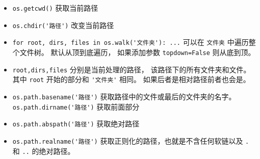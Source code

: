 
\begin{issues}
\issueDraft
\end{issues}

\begin{itemize}
\item \verb`os.getcwd()` 获取当前路径
\item \verb`os.chdir('路径')` 改变当前路径 
\item \verb`for root, dirs, files in os.walk('文件夹'): ...` 可以在 \verb`文件夹` 中遍历整个文件树。 默认从顶到底遍历， 如果添加参数 \verb`topdown=False` 则从底到顶。
\item \verb`root,dirs,files` 分别是当前处理的路径， 该路径下的所有文件夹和文件。 其中 \verb`root` 开始的部分和 \verb`'文件夹'` 相同。 如果后者是相对路径前者也会是。
\item \verb`os.path.basename('路径')` 获取路径中的文件或最后的文件夹的名字。 \verb`os.path.dirname('路径')` 获取前面部分
\item \verb`os.path.abspath('路径')` 获取绝对路径
\item \verb`os.path.realname('路径')` 获取正则化的路径，也就是不含任何软链以及 \verb`.` 和 \verb`..` 的绝对路径。
\end{itemize}
